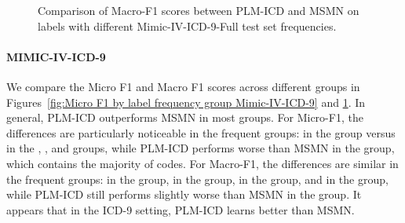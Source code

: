 \documentclass[11pt]{article}
\begin{document}
\begin{figure}[!t]


    \caption{Comparison of Macro-F1 scores between PLM-ICD and MSMN on labels with different Mimic-IV-ICD-9-Full test set frequencies.}
    \label{fig:Macro F1 by label frequency group Mimic-IV-ICD-9}
\end{figure}
\paragraph{MIMIC-IV-ICD-9}
We compare the Micro F1 and Macro F1 scores across different groups in Figures~\ref{fig:Micro F1 by label frequency group Mimic-IV-ICD-9} and \ref{fig:Macro F1 by label frequency group Mimic-IV-ICD-9}. In general, PLM-ICD outperforms MSMN in most groups. For Micro-F1, the differences are particularly noticeable in the frequent groups:  in the  group versus  in the , , and  groups, while PLM-ICD performs worse than MSMN in the  group, which contains the majority of codes. For Macro-F1, the differences are similar in the frequent groups:  in the  group,  in the  group,  in the  group, and  in the  group, while PLM-ICD still performs slightly worse than MSMN in the  group. It appears that in the ICD-9 setting, PLM-ICD learns better than MSMN.
\end{document}
